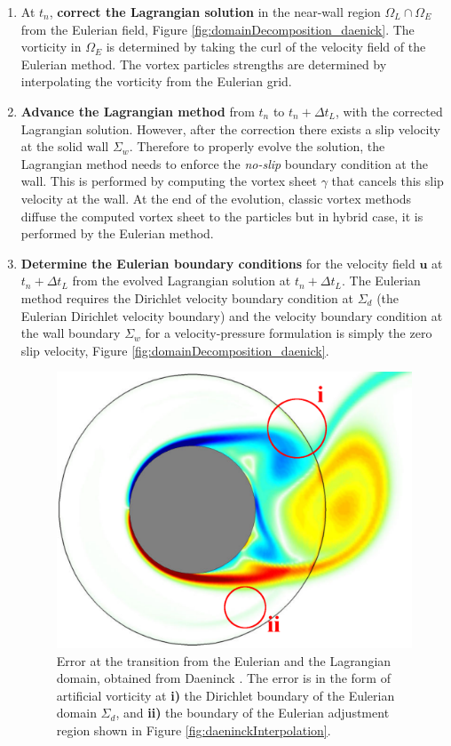 	\begin{enumerate}
	\item At $t_n$, \textbf{correct the Lagrangian solution} in the near-wall region $\Omega_L\cap\Omega_E$ from the Eulerian field, Figure \ref{fig:domainDecomposition_daenick}. The vorticity in $\Omega_E$ is determined by taking the curl of the velocity field of the Eulerian method. The vortex particles strengths are determined by interpolating the vorticity from the Eulerian grid.
	
	\item \textbf{Advance the Lagrangian method} from $t_n$ to $t_{n}+\Delta t_L$, with the corrected Lagrangian solution. However, after the correction there exists a slip velocity at the solid wall $\Sigma_w$. Therefore to properly evolve the solution, the Lagrangian method needs to enforce the \textit{no-slip} boundary condition at the wall. This is performed by computing the vortex sheet $\gamma$ that cancels this slip velocity at the wall. At the end of the evolution, classic vortex methods diffuse the computed vortex sheet to the particles but in hybrid case, it is performed by the Eulerian method.
	
	\item \textbf{Determine the Eulerian boundary conditions} for the velocity field $\mathbf{u}$ at $t_{n}+\Delta t_L$ from the evolved Lagrangian solution at $t_{n} + \Delta t_L$. The Eulerian method requires the Dirichlet velocity boundary condition at $\Sigma_d$ (the Eulerian Dirichlet velocity boundary) and the velocity boundary condition at the wall boundary $\Sigma_w$ for a velocity-pressure formulation is simply the zero slip velocity, Figure \ref{fig:domainDecomposition_daenick}.
	
		\begin{figure}[!t]
			\centering
			\includegraphics[width=0.5\linewidth]{figures/hybrid/daeninck_CylinderVorticityMod.png}
			\caption{Error at the transition from the Eulerian and the Lagrangian domain, obtained from Daeninck \cite{Daeninck2006}. The error is in the form of artificial vorticity at \textbf{i)} the Dirichlet boundary of the Eulerian domain $\Sigma_d$, and \textbf{ii)} the boundary of the Eulerian adjustment region shown in Figure \ref{fig:daeninckInterpolation}.}
			\label{fig:daeninck_CylinderVorticityMod}
		\end{figure}				
	

\end{enumerate}
